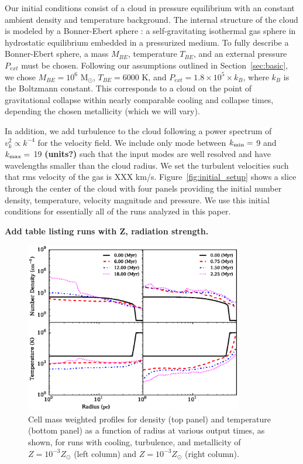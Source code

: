 \documentclass[useAMS,usenatbib]{mn2e}
\newcommand{\msun}{{M$_\odot$}}
\begin{document}
Our initial conditions consist of a cloud in pressure equilibrium with an
constant ambient density and temperature background. The internal structure of the
cloud is modeled by a Bonner-Ebert sphere \cite{Bonnor1956}: a self-gravitating
isothermal gas sphere in hydrostatic equilibrium embedded in a pressurized  
medium. To fully describe a Bonner-Ebert sphere, a mass $M_{BE}$, temperature
$T_{BE}$, and an external pressure $P_{ext}$ must be chosen. Following our
assumptions outlined in Section~\ref{sec:basic}, we chose
$M_{BE}=10^6$ \msun, $T_{BE}=6000$ K, and $P_{ext}=1.8\times10^5\times k_B$, 
where $k_B$ is the Boltzmann constant. This corresponds to a cloud on the point of
gravitational collapse within nearly comparable cooling and collapse times,
depending the chosen metallicity (which we will vary).

In addition, we add turbulence to the cloud following a power spectrum of
$v_k^2 \propto k^{-4}$ for the velocity field.  We include only mode between
$k_{\rm min}=$ 9 and $k_{\rm max} =$ 19 {\bf (units?)} such that the input modes are well resolved
and have wavelengths smaller than the cloud radius.  We set the turbulent velocities
such that rms velocity of the gas is XXX km/s. Figure~\ref{fig:initial_setup} shows 
a slice through the center of the cloud with four panels providing
the initial number density, temperature, velocity magnitude and pressure.  We use
this initial conditions for essentially all of the runs analyzed in this paper.


{\bf Add table listing runs with Z, radiation strength.}

% 


\begin{figure}
\begin{center}
\includegraphics[width=9.5cm]{Images/profile_panel}
\end{center}
\caption{\label{fig:profiles} Cell mass weighted profiles for 
density (top panel) and temperature (bottom panel) as a function of radius at various 
output times, as shown, for runs with cooling, turbulence, and metallicity of $Z=10^{-3}Z_\odot$
(left column) and $Z=10^{-3}Z_\odot$ (right column).}
\end{figure}
\end{document}
